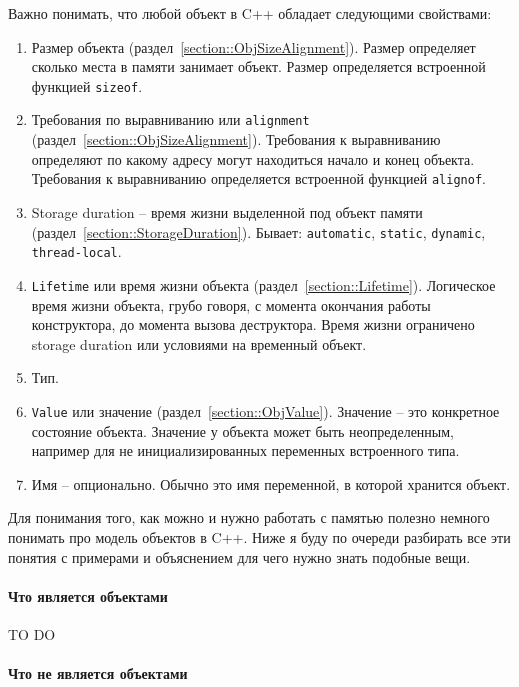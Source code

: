\documentclass{article}
\begin{document}
Важно понимать, что любой объект в C++ обладает следующими свойствами:
\begin{enumerate}
\item Размер объекта (раздел~\ref{section::ObjSizeAlignment}).
Размер определяет сколько места в памяти занимает объект.
Размер определяется встроенной функцией \verb"sizeof".


\item Требования по выравниванию или \verb"alignment" (раздел~\ref{section::ObjSizeAlignment}).
Требования к выравниванию определяют по какому адресу могут находиться начало и конец объекта.
Требования к выравниванию определяется встроенной функцией \verb"alignof".

\item Storage duration -- время жизни выделенной под объект памяти (раздел~\ref{section::StorageDuration}).
Бывает: \verb"automatic", \verb"static", \verb"dynamic", \verb"thread-local".

\item \verb"Lifetime" или время жизни объекта (раздел~\ref{section::Lifetime}).
Логическое время жизни объекта, грубо говоря, с момента окончания работы конструктора, до момента вызова деструктора.
Время жизни ограничено storage duration или условиями на временный объект.

\item Тип.

\item \verb"Value" или значение (раздел~\ref{section::ObjValue}).
Значение -- это конкретное состояние объекта.
Значение у объекта может быть неопределенным, например для не инициализированных переменных встроенного типа.

\item Имя -- опционально.
Обычно это имя переменной, в которой хранится объект.
\end{enumerate}
Для понимания того, как можно и нужно работать с памятью полезно немного понимать про модель объектов в C++.
Ниже я буду по очереди разбирать все эти понятия с примерами и объяснением для чего нужно знать подобные вещи.

\paragraph{Что является объектами}

TO DO

\paragraph{Что не является объектами}
\end{document}

